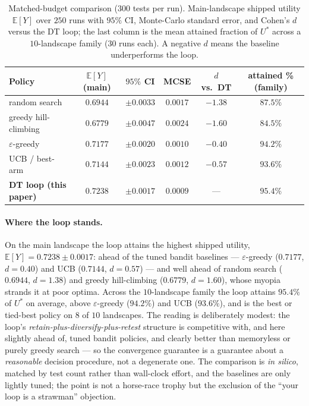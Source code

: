 \documentclass[11pt]{article}
\newcommand{\E}{\mathbb{E}}
\begin{document}
\begin{table}[h!]
\centering
\caption{Matched-budget comparison ($300$ tests per run). Main-landscape shipped utility $\E[Y]$ over $250$ runs with $95\%$ CI, Monte-Carlo standard error, and Cohen's $d$ versus the DT loop; the last column is the mean attained fraction of $U^*$ across a $10$-landscape family ($30$ runs each). A negative $d$ means the baseline underperforms the loop.}
\label{tab:bench}
\footnotesize
\begin{tabular}{@{}lccccc@{}}
\toprule
\textbf{Policy} & $\E[Y]$ (main) & $95\%$ CI & MCSE & $d$ vs.\ DT & attained \% (family) \\
\midrule
random search            & $0.6944$ & $\pm0.0033$ & $0.0017$ & $-1.38$ & $87.5\%$ \\
greedy hill-climbing     & $0.6779$ & $\pm0.0047$ & $0.0024$ & $-1.60$ & $84.5\%$ \\
$\varepsilon$-greedy     & $0.7177$ & $\pm0.0020$ & $0.0010$ & $-0.40$ & $94.2\%$ \\
UCB / best-arm           & $0.7144$ & $\pm0.0023$ & $0.0012$ & $-0.57$ & $93.6\%$ \\
\textbf{DT loop (this paper)} & $\mathbf{0.7238}$ & $\pm0.0017$ & $0.0009$ & --- & $\mathbf{95.4\%}$ \\
\bottomrule
\end{tabular}
\end{table}

\paragraph{Where the loop stands.} On the main landscape the loop attains the highest shipped utility, $\E[Y]=0.7238\pm0.0017$: ahead of the tuned bandit baselines --- $\varepsilon$-greedy ($0.7177$, $d=0.40$) and UCB ($0.7144$, $d=0.57$) --- and well ahead of random search ($0.6944$, $d=1.38$) and greedy hill-climbing ($0.6779$, $d=1.60$), whose myopia strands it at poor optima. Across the $10$-landscape family the loop attains $95.4\%$ of $U^*$ on average, above $\varepsilon$-greedy ($94.2\%$) and UCB ($93.6\%$), and is the best or tied-best policy on $8$ of $10$ landscapes. The reading is deliberately modest: the loop's \emph{retain-plus-diversify-plus-retest} structure is competitive with, and here slightly ahead of, tuned bandit policies, and clearly better than memoryless or purely greedy search --- so the convergence guarantee is a guarantee about a \emph{reasonable} decision procedure, not a degenerate one. The comparison is \emph{in silico}, matched by test count rather than wall-clock effort, and the baselines are only lightly tuned; the point is not a horse-race trophy but the exclusion of the ``your loop is a strawman'' objection.
\end{document}
